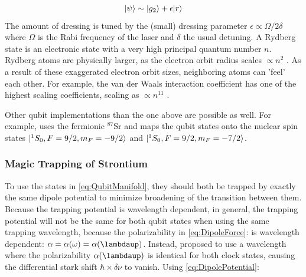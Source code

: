 \begin{equation}\label{eq:RydbergDressing}
	\lvert\psi\rangle \sim \lvert g_2\rangle + \epsilon \lvert r\rangle
\end{equation}
The amount of dressing is tuned by the (small) dressing parameter $\epsilon \propto \Omega / 2\delta$ where $\Omega$ is the Rabi frequency of the laser and $\delta$ the usual detuning. 
A Rydberg state is an electronic state with a very high principal quantum number $n$. Rydberg atoms are physically larger, as the electron orbit radius scales $\propto n^2$ \cite{Gallagher1994}. 
As a result of these exaggerated electron orbit sizes, neighboring atoms can 'feel' each other.
For example, the van der Waals interaction coefficient has one of the highest scaling coefficients, scaling as $\propto n^{11}$ \cite{Gallagher1994}. 

Other qubit implementations than the one above are possible as well.
For example, \cite{Barnes2021} uses the fermionic ${}^{87}$Sr and maps the qubit states onto the nuclear spin states $\lvert{}^1S_0, F=9/2, m_F = -9/2\rangle$ and $\lvert{}^1S_0, F=9/2, m_F = -7/2\rangle$.

\subsubsection*{Magic Trapping of Strontium}\label{sec:Magic}

To use the states in \cref{eq:QubitManifold}, they should both be trapped by exactly the same dipole potential to minimize broadening of the transition between them.
Because the trapping potential is wavelength dependent, in general, the trapping potential will not be the same for both qubit states when using the same trapping wavelength, because the polarizability in \cref{eq:DipoleForce}: is wavelength dependent: $\alpha = \alpha(\omega) = \alpha(\lambdaup)$.
Instead, \cite{Katori2003} proposed to use a wavelength where the polarizability $\alpha(\lambdaup)$ is identical for both clock states, causing the differential stark shift $\hbar \times \delta \nu$ to vanish.
Using \cref{eq:DipolePotential}:

